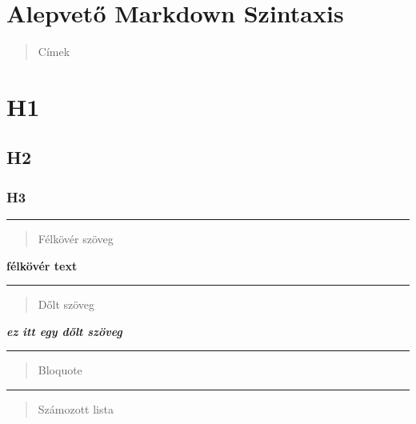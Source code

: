 \documentclass[
]{article}
\author{}
\date{}
\begin{document}
\hypertarget{alepvetux151-markdown-szintaxis}{%
\section{Alepvető Markdown
Szintaxis}\label{alepvetux151-markdown-szintaxis}}

\begin{quote}
Címek
\end{quote}

\hypertarget{h1}{%
\section{H1}\label{h1}}

\hypertarget{h2}{%
\subsection{H2}\label{h2}}

\hypertarget{h3}{%
\subsubsection{H3}\label{h3}}

\begin{center}\rule{0.5\linewidth}{0.5pt}\end{center}

\begin{quote}
Félkövér szöveg
\end{quote}

\textbf{félkövér text}

\begin{center}\rule{0.5\linewidth}{0.5pt}\end{center}

\begin{quote}
Dőlt szöveg
\end{quote}

\textbf{\emph{ez itt egy dőlt szöveg}}

\begin{center}\rule{0.5\linewidth}{0.5pt}\end{center}

\begin{quote}
Bloquote
\end{quote}

\begin{center}\rule{0.5\linewidth}{0.5pt}\end{center}

\begin{quote}
Számozott lista
\end{quote}
\end{document}
